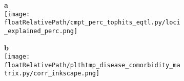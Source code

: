 %
%

\begin{figure}[!tbp]
    \centering

    \begin{subfigure}[]{0.65\textwidth}
        \textbf{a}
        \\
        \texttt{[image: \\floatRelativePath/cmpt\_perc\_tophits\_eqtl.py/loci\_explained\_perc.png]}
    \end{subfigure}

    \begin{subfigure}[]{0.85\textwidth}
        \textbf{b}
        \\
        \texttt{[image: \\floatRelativePath/plthtmp\_disease\_comorbidity\_matrix.py/corr\_inkscape.png]}
    \end{subfigure}

    \caption{}
%
\end{figure}

%
%

